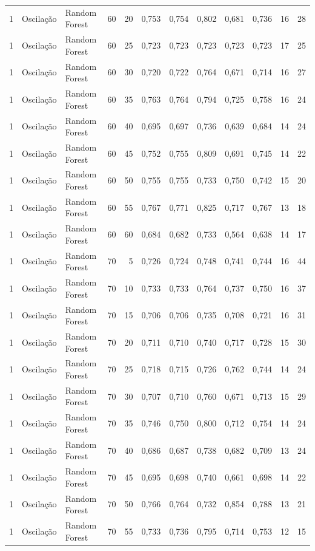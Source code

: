 \begin{longtable}{@{}rllrrrrrrrrr@{}}
1 & Oscilação & Random Forest & 60 & 20 & 0,753 & 0,754 & 0,802 & 0,681 & 0,736 & 16 & 28 \\
1 & Oscilação & Random Forest & 60 & 25 & 0,723 & 0,723 & 0,723 & 0,723 & 0,723 & 17 & 25 \\
1 & Oscilação & Random Forest & 60 & 30 & 0,720 & 0,722 & 0,764 & 0,671 & 0,714 & 16 & 27 \\
1 & Oscilação & Random Forest & 60 & 35 & 0,763 & 0,764 & 0,794 & 0,725 & 0,758 & 16 & 24 \\
1 & Oscilação & Random Forest & 60 & 40 & 0,695 & 0,697 & 0,736 & 0,639 & 0,684 & 14 & 24 \\
1 & Oscilação & Random Forest & 60 & 45 & 0,752 & 0,755 & 0,809 & 0,691 & 0,745 & 14 & 22 \\
1 & Oscilação & Random Forest & 60 & 50 & 0,755 & 0,755 & 0,733 & 0,750 & 0,742 & 15 & 20 \\
1 & Oscilação & Random Forest & 60 & 55 & 0,767 & 0,771 & 0,825 & 0,717 & 0,767 & 13 & 18 \\
1 & Oscilação & Random Forest & 60 & 60 & 0,684 & 0,682 & 0,733 & 0,564 & 0,638 & 14 & 17 \\
1 & Oscilação & Random Forest & 70 & 5 & 0,726 & 0,724 & 0,748 & 0,741 & 0,744 & 16 & 44 \\
1 & Oscilação & Random Forest & 70 & 10 & 0,733 & 0,733 & 0,764 & 0,737 & 0,750 & 16 & 37 \\
1 & Oscilação & Random Forest & 70 & 15 & 0,706 & 0,706 & 0,735 & 0,708 & 0,721 & 16 & 31 \\
1 & Oscilação & Random Forest & 70 & 20 & 0,711 & 0,710 & 0,740 & 0,717 & 0,728 & 15 & 30 \\
1 & Oscilação & Random Forest & 70 & 25 & 0,718 & 0,715 & 0,726 & 0,762 & 0,744 & 14 & 24 \\
1 & Oscilação & Random Forest & 70 & 30 & 0,707 & 0,710 & 0,760 & 0,671 & 0,713 & 15 & 29 \\
1 & Oscilação & Random Forest & 70 & 35 & 0,746 & 0,750 & 0,800 & 0,712 & 0,754 & 14 & 24 \\
1 & Oscilação & Random Forest & 70 & 40 & 0,686 & 0,687 & 0,738 & 0,682 & 0,709 & 13 & 24 \\
1 & Oscilação & Random Forest & 70 & 45 & 0,695 & 0,698 & 0,740 & 0,661 & 0,698 & 14 & 22 \\
1 & Oscilação & Random Forest & 70 & 50 & 0,766 & 0,764 & 0,732 & 0,854 & 0,788 & 13 & 21 \\
1 & Oscilação & Random Forest & 70 & 55 & 0,733 & 0,736 & 0,795 & 0,714 & 0,753 & 12 & 15 \\

\end{longtable}
